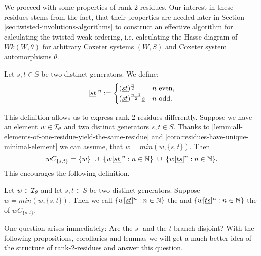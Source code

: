 We proceed with some properties of rank-2-residues. Our interest in these residues stems from the fact, that their properties are needed later in Section \ref{sec:twisted-involutions-algorithms} to construct an effective algorithm for calculating the twisted weak ordering, i.e. calculating the Hasse diagram of $Wk(W,\theta)$ for arbitrary Coxeter systems $(W,S)$ and Coxeter system automorphisms $\theta$.

\begin{defi}
	Let $s,t \in S$ be two distinct generators. We define:
	$$[\underline{s} \underline{t}]^n :=
	\begin{cases}
	(\underline{s} \underline{t})^{\frac{n}{2}} & n \textrm{ even}, \\
	(\underline{s} \underline{t})^{\frac{n-1}{2}} \underline{s} & n \textrm{ odd}. 
	\end{cases}$$
\end{defi}

This definition allows us to express rank-2-residues differently. Suppose we have an element $w \in \mathcal{I}_{\theta}$ and two distinct generators $s,t \in S$. Thanks to \ref{lemm:all-elements-of-one-residue-yield-the-same-residue} and \ref{coro:residues-have-unique-minimal-element} we can assume, that $w = min(w,\{s,t\})$. Then
$$ wC_{\{s,t\}} = \{ w \} \ \cup \ \{ w [\underline{s} \underline{t}]^n : n \in \mathbb{N} \} \ \cup \ \{ w [\underline{t} \underline{s}]^n : n \in \mathbb{N} \}. $$
This encourages the following definition.

\begin{defi}
	Let $w \in \mathcal{I}_{\theta}$ and let $s,t \in S$ be two distinct generators. Suppose $w = min(w,\{s,t\})$. Then we call $\{ w [\underline{s} \underline{t}]^n : n \in \mathbb{N} \}$ the  and $\{ w [\underline{t} \underline{s}]^n : n \in \mathbb{N} \}$ the  of $wC_{\{s,t\}}$.
\end{defi}

One question arises immediately: Are the $s$- and the $t$-branch disjoint? With the following propositions, corollaries and lemmas we will get a much better idea of the structure of rank-2-residues and answer this question.

